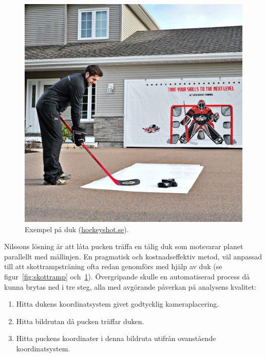 \documentclass[a4paper,12pt]{article}
\begin{document}
\begin{figure}[ht]
  \centering
  \includegraphics[width=\linewidth]{photos/shooting-tarp.jpg}
  \caption{Exempel på duk
  (\href{http://www.hockeyshot.se/HockeyShot-Extreme-Shooting-Tarp-p/target-tarp-032.htm}{hockeyshot.se}).
  \label{fig:duk}}
\end{figure}

Nilssons lösning är att låta pucken träffa en tålig duk som motsvarar planet
parallellt med mållinjen. En pragmatisk och kostnadseffektiv metod, väl
anpassad till att skottrampsträning ofta redan genomförs med hjälp av duk
(se figur~\ref{fig:skottramp} och~\ref{fig:duk}). Övergripande skulle en
automatiserad process då kunna brytas ned i tre steg, alla med avgörande
påverkan på analysens kvalitet:
\begin{enumerate}
  \item \label{enum:step1} Hitta dukens koordinatsystem givet godtycklig
    kameraplacering.
  \item \label{enum:step2} Hitta bildrutan då pucken träffar duken.
  \item \label{enum:step3} Hitta puckens koordinater i denna bildruta utifrån
    ovanstående koordinatsystem.
\end{enumerate}
\end{document}
